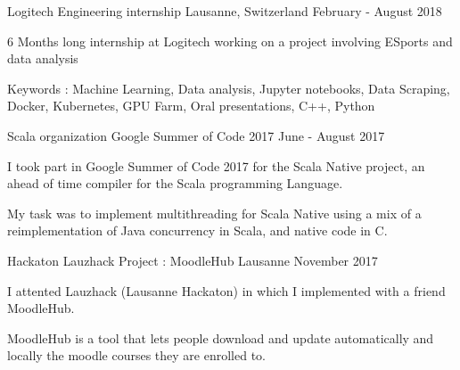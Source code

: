 


\begin{cventries}
	

\cventry
{Logitech} %
{Engineering internship} %
{Lausanne, Switzerland} %
{February - August 2018} %
{ %
	\begin{cvitems}
		\item {6 Months long internship at Logitech working on a project involving ESports and data analysis}
		\item {Keywords : Machine Learning, Data analysis, Jupyter notebooks, Data Scraping, Docker, Kubernetes, GPU Farm, Oral presentations, C++, Python}
	\end{cvitems}
}
	

\cventry
{Scala organization} %
{Google Summer of Code 2017} %
{} %
{June - August 2017} %
{ %
\begin{cvitems}
\item {I took part in Google Summer of Code 2017 for the Scala Native project, an ahead of time compiler for the Scala programming Language.}
\item {My task was to implement multithreading for Scala Native using a mix of a reimplementation of Java concurrency in Scala, and native code in C.}
\end{cvitems}
}


\cventry
{Hackaton} %
{Lauzhack Project : MoodleHub} %
{Lausanne} %
{November 2017} %
{ %
	\begin{cvitems}
		\item {I attented Lauzhack (Lausanne Hackaton) in which I implemented with a friend MoodleHub.}
		\item {MoodleHub is a tool that lets people download and update automatically and locally the moodle courses they are enrolled to.}
	\end{cvitems}
}


\end{cventries}
